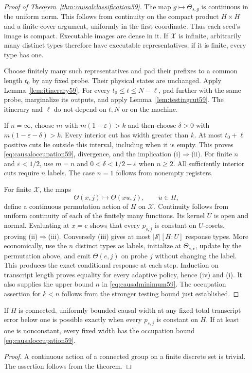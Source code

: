 \begin{proof}[Proof of Theorem~\ref{thm:causalclassification59}]
The map $g\mapsto\Theta_{s,g}$ is continuous in the uniform norm.
This follows from continuity on the compact product $H\times H$ and a
finite-cover argument, uniformly in the first coordinate. Thus each
seed's image is compact. Executable images are dense in it. If
$\mathcal X$ is infinite, arbitrarily many distinct types therefore
have executable representatives; if it is finite, every type has one.

Choose finitely many such representatives and pad their prefixes to a
common length $t_0$ by any fixed probe. Their physical states are
unchanged. Apply Lemma~\ref{lem:itinerary59}. For every
$t_0\le t\le N-\ell$, pad further with the same probe, marginalize its
outputs, and apply Lemma~\ref{lem:testingcut59}. The itinerary and
$\ell$ do not depend on $t,N$ or on the machine.

If $n=\infty$, choose $m$ with $m(1-\varepsilon)>k$ and then choose
$\delta>0$ with $m(1-\varepsilon-\delta)>k$. Every interior cut has
width greater than $k$. At most $t_0+\ell$ positive cuts lie outside
this interval, including when it is empty. This proves
\eqref{eq:causaloccupation59}, divergence, and the implication (i)$\Rightarrow$(ii).
For finite $n$ and $\varepsilon<1/2$, use $m=n$ and
$0<\delta<1/2-\varepsilon$ when $n\ge2$. All sufficiently interior
cuts require $n$ labels. The case $n=1$ follows from nonempty registers.

For finite $\mathcal X$, the maps
\[
 \Theta(x,j)\longmapsto\Theta(xu,j),\qquad u\in H,
\]
define a continuous permutation action of $H$ on $\mathcal X$.
Continuity follows from uniform continuity of each of the finitely many
functions. Its kernel $U$ is open and normal. Evaluating at $x=e$
shows that every $p_{s,j}$ is constant on $U$-cosets, proving
(ii)$\Rightarrow$(iii). Conversely (iii) gives at most
$|\mathcal S|[H:U]$ response types. More economically, use the $n$
distinct types as labels, initialize at $\Theta_{s,e}$, update by the
permutation above, and emit $\Theta(e,j)$ on probe $j$ without changing
the label. This produces the exact conditional response at each step.
Induction on transcript length proves equality for every adaptive
policy, hence (iv) and (i). It also supplies the upper bound $n$ in
\eqref{eq:causalminimum59}. The occupation assertion for $k<n$ follows
from the stronger testing bound just established.
\end{proof}

\begin{corollary}\label{cor:connectedprocess59}
If $H$ is connected, uniformly bounded causal width at any fixed total
transcript error below one is possible exactly when every $p_{s,j}$ is
constant on $H$. If at least one is nonconstant, every fixed width has
the occupation bound \eqref{eq:causaloccupation59}.
\end{corollary}
\begin{proof}
A continuous action of a connected group on a finite discrete set is
trivial. The assertion follows from the theorem.
\end{proof}

